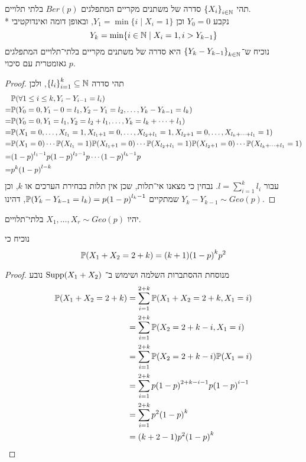 \question{}
תהי ${\{X_i\}}_{i \in \mathbb{N}}$ סדרה של משתנים מקריים המתפלגים $Ber(p)$ בלתי תלויים. \\*
נקבע $Y_0 = 0$ וכן $Y_1 = \min \{i \mid X_i = 1\}$, ובאופן דומה ואינדוקטיבי
\[
	Y_k = \min \{i \in \mathbb{N} \mid X_i = 1, i > Y_{k - 1}\}
\]
נוכיח ש־${\{Y_k - Y_{k - 1}\}}_{k \in \mathbb{N}}$ היא סדרה של משתנים מקריים בלתי־תלויים המתפלגים גאומטרית עם סיכוי $p$.
\begin{proof}
	תהי סדרה ${\{l_i\}}_{i = 1}^k \subseteq \mathbb{N}$, ולכן
	\begin{align*}
		& \mathbb{P}(\forall 1 \le i \le k, Y_i - Y_{i - 1} = l_i) \\
		= & \mathbb{P}(Y_0 = 0, Y_1 - 0 = l_1, Y_2 - Y_1 = l_2, \dots, Y_k - Y_{k - 1} = l_k) \\
		= & \mathbb{P}(Y_0 = 0, Y_1 = l_1, Y_2 = l_2 + l_1, \dots, Y_k = l_k + \cdots + l_1) \\
		= & \mathbb{P}(X_1 = 0, \dots, X_{l_1} = 1, X_{l_1 + 1} = 0, \dots, X_{l_2 + l_1} = 1, X_{l_2 + 1} = 0, \dots, X_{l_k + \cdots + l_1} = 1) \\
		= & \mathbb{P}(X_1 = 0) \cdots \mathbb{P}(X_{l_1} = 1) \mathbb{P}(X_{l_1 + 1} = 0) \cdots \mathbb{P}(X_{l_2 + l_1} = 1) \mathbb{P}(X_{l_2 + 1} = 0) \cdots \mathbb{P}(X_{l_k + \cdots + l_1} = 1) \\
		= & {(1 - p)}^{l_1 - 1} p {(1 - p)}^{l_2 - 1} p \cdots {(1 - p)}^{l_k - 1} p \\
		= & p^k {(1 - p)}^{l - k}
	\end{align*}
	עבור $l = \sum_{i = 1}^k l_i$.
	נבחין כי מצאנו אי־תלות, שכן אין תלות בבחירת הערכים או $k$, וכן שמתקיים $\mathbb{P}(Y_k - Y_{k - 1} = l_k) = p {(1 - p)}^{l_k - 1}$, דהינו $Y_k - Y_{k - 1} \sim Geo(p)$.
\end{proof}

\question{}
יהיו $X_1, \dots, X_r \sim Geo(p)$ בלתי־תלויים.

\subquestion{}
נוכיח כי
\[
	\mathbb{P}(X_1 + X_2 = 2 + k)
	= (k + 1) {(1 - p)}^k p^2
\]
\begin{proof}
	מנוסחת ההסתברות השלמה ושימוש ב־ $\operatorname{Supp}(X_1 + X_2)$ נובע
	\begin{align*}
		\mathbb{P}(X_1 + X_2 = 2 + k)
		& = \sum_{i = 1}^{2 + k} \mathbb{P}(X_1 + X_2 = 2 + k, X_1 = i) \\
		& = \sum_{i = 1}^{2 + k} \mathbb{P}(X_2 = 2 + k - i, X_1 = i) \\
		& = \sum_{i = 1}^{2 + k} \mathbb{P}(X_2 = 2 + k - i) \mathbb{P}(X_1 = i) \\
		& = \sum_{i = 1}^{2 + k} p {(1 - p)}^{2 + k - i - 1} p {(1 - p)}^{i - 1} \\
		& = \sum_{i = 1}^{2 + k} p^2 {(1 - p)}^{k} \\
		& = (k + 2 - 1) p^2 {(1 - p)}^{k}
	\end{align*}
\end{proof}


